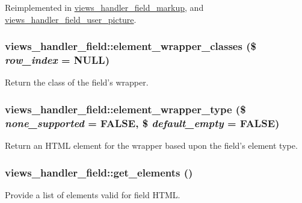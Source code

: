 Reimplemented in \hyperlink{classviews__handler__field__markup_ac8cb32153441482ce1dc79341dfd86c2}{views\_\-handler\_\-field\_\-markup}, and \hyperlink{classviews__handler__field__user__picture_aa6bb83c59c2ef592545cbdf9a41f9878}{views\_\-handler\_\-field\_\-user\_\-picture}.\hypertarget{classviews__handler__field_a5580688b4fc24233e03ad3bc5aca26de}{
\subsubsection[{element\_\-wrapper\_\-classes}]{\setlength{\rightskip}{0pt plus 5cm}views\_\-handler\_\-field::element\_\-wrapper\_\-classes (\$ {\em row\_\-index} = {\ttfamily NULL})}}
\label{classviews__handler__field_a5580688b4fc24233e03ad3bc5aca26de}
Return the class of the field's wrapper. \hypertarget{classviews__handler__field_a67d3b25f697d23c7fa457dbe9817dce8}{
\subsubsection[{element\_\-wrapper\_\-type}]{\setlength{\rightskip}{0pt plus 5cm}views\_\-handler\_\-field::element\_\-wrapper\_\-type (\$ {\em none\_\-supported} = {\ttfamily FALSE}, \/  \$ {\em default\_\-empty} = {\ttfamily FALSE})}}
\label{classviews__handler__field_a67d3b25f697d23c7fa457dbe9817dce8}
Return an HTML element for the wrapper based upon the field's element type. \hypertarget{classviews__handler__field_af23aa556c6db633f0393390ba4ff190b}{
\subsubsection[{get\_\-elements}]{\setlength{\rightskip}{0pt plus 5cm}views\_\-handler\_\-field::get\_\-elements ()}}
\label{classviews__handler__field_af23aa556c6db633f0393390ba4ff190b}
Provide a list of elements valid for field HTML.

